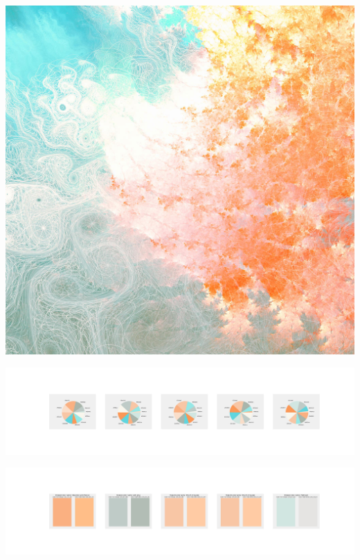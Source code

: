 \documentclass[11pt]{article}
\begin{document}
\begin{landscape}
    \begin{center}
    \includegraphics[width=\textwidth]{./nbimg/file (323).jpg}
    \end{center}

    \begin{center}
    \includegraphics[width=250mm]{./nbimg/pie-249.jpg}
    \end{center}

    \begin{center}
    \includegraphics[width=250mm]{./nbimg/peak-249.jpg}
    \end{center}
    


\end{landscape}
\end{document}
